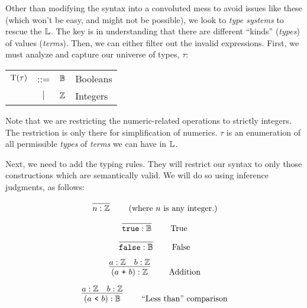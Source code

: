
Other than modifying the syntax into a convoluted mess to avoid issues like
these (which won't be easy, and might not be possible), we look to \textit{type
      systems} to rescue the \(\mathbb{L}\). The key is in understanding that there are
different ``kinds'' (\textit{types}) of values (\textit{terms}). Then, we can
either filter out the invalid expressions. First, we must analyze and capture
our universe of types, \(\tau\):

\begin{longtable}{ r c c l}
      \(\mathrm{T}(\tau)\) & ::=       & \(\mathbb{B}\) & Booleans \\
                     & \(\vert\) & \(\mathbb{Z}\) & Integers
\end{longtable}

Note that we are restricting the numeric-related operations to strictly
integers. The restriction is only there for simplification of numerics. \(\tau\)
is an enumeration of all permissible \textit{types} of \textit{terms} we can
have in \(\mathbb{L}\).

Next, we need to add the typing rules. They will restrict our syntax to only
those constructions which are semantically valid. We will do so using inference
judgments, as follows:

\begin{equation}
      \left.
      \infer{n : \bb{Z}}{}
      \right.
      \qquad
      \text{(where \(n\) is any integer.)}
      \label{eq:exTR:int}
\end{equation}

\begin{equation}
      \left.
      \infer{\texttt{true} : \bb{B}}{}
      \right.
      \qquad
      \text{True}
      \label{eq:exTR:true}
\end{equation}

\begin{equation}
      \left.
      \infer{\texttt{false} : \bb{B}}{}
      \right.
      \qquad
      \text{False}
      \label{eq:exTR:false}
\end{equation}

\begin{equation}
      \left.
      \infer{(a\ \texttt{+}\ b) : \bb{Z}}
      {a : \bb{Z}  &  b : \bb{Z}}
      \right.
      \qquad
      \text{Addition}
      \label{eq:exTR:addition}
\end{equation}

\begin{equation}
      \left.
      \infer{(a\ \texttt{<}\ b) : \bb{B}}
      {a : \bb{Z}  &  b : \bb{Z}}
      \right.
      \qquad
      \text{``Less than'' comparison}
      \label{eq:exTR:lessThan}
\end{equation}

